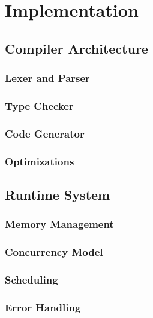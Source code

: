 \chapter{Implementation}

\section{Compiler Architecture}

\subsection{Lexer and Parser}

\subsection{Type Checker}

\subsection{Code Generator}

\subsection{Optimizations}

\section{Runtime System}

\subsection{Memory Management}

\subsection{Concurrency Model}

\subsection{Scheduling}

\subsection{Error Handling}

